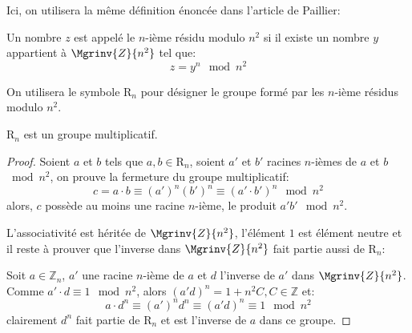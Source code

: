 		Ici, on utilisera la même définition énoncée dans l'article de Paillier:
		\begin{definition} Un nombre $z$ est appelé le $n$-ième résidu modulo $n^2$ si il existe un nombre $y$ appartient à $\Mgrinv{Z}{n^2}$ tel que:
			$$z = y^n \mod{n^2}$$
		\end{definition}
		\begin{definition} On utilisera le symbole $\mathrm{R}_n$ pour désigner le groupe formé par les $n$-ième résidus modulo $n^2$.
		\end{definition}
		\begin{theorem} $\mathrm{R}_n$ est un groupe multiplicatif.
			\label{theorem:rGrMul}
			\begin{proof}
				 	Soient $a$ et $b$ tels que $a,b \in \mathrm{R}_n$, soient $a'$ et $b'$ racines $n$-ièmes de $a$ et $b$ $\bmod{n^2}$, 
					on prouve la fermeture du groupe multiplicatif: 
					$$c = a\cdot b \equiv (a')^n(b')^n \equiv (a'\cdot b')^n\mod{n^2}$$
					alors, $c$ possède au moins une racine $n$-ième, le produit $a'b'\mod{n^2}$.

			L'associativité est héritée de $\Mgrinv{Z}{n^2}$, l'élément $1$ est élément neutre et il reste 
			à prouver que l'inverse dans $\Mgrinv{Z}{n^2}$ fait partie aussi de $\mathrm{R}_n$:

				Soit $a\in\mathbb{Z}_n$, $a'$ une racine $n$-ième de $a$ et $d$ l'inverse de $a'$ dans $\Mgrinv{Z}{n^2}$. 
				Comme $a'\cdot d \equiv 1\mod{n^2}$, alors $ (a'd)^n = 1+n^2C, C\in\mathbb{Z}$ et:
				\begin{equation}
					a\cdot d^n \equiv (a')^nd^n \equiv (a'd)^n \equiv 1\mod{n^2}
				\end{equation}
				clairement $d^n$ fait partie de $\mathrm{R}_n$ et est l'inverse de $a$ dans ce groupe.
			\end{proof}
		\end{theorem}

